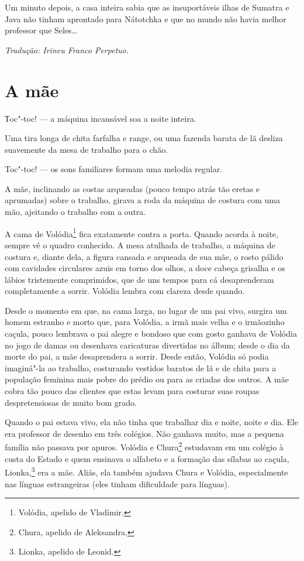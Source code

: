 Um minuto depois, a casa inteira sabia que as insuportáveis ilhas de
Sumatra e Java não tinham aprontado para Nátotchka e que no mundo não
havia melhor professor que Seles\ldots{}

\medskip

{\footnotesize\hfill\emph{Tradução: Irineu Franco Perpetuo.}}

\chapter{A mãe}\label{part13}

Тoc"-toc! --- a máquina incansável soa a noite inteira.

Uma tira longa de chita farfalha e range, ou uma fazenda barata de lã
desliza suavemente da mesa de trabalho para o chão.

Toc"-toc! --- os sons familiares formam uma melodia regular.

A mãe, inclinando as costas arqueadas (pouco tempo atrás tão eretas e
aprumadas) sobre o trabalho, girava a roda da máquina de costura com uma
mão, ajeitando o trabalho com a outra.

A cama de Volódia\footnote{Volódia, apelido de Vladímir.} fica
exatamente contra a porta. Quando acorda à noite, sempre vê o quadro
conhecido. A mesa atulhada de trabalho, a máquina de costura e, diante
dela, a figura cansada e arqueada de sua mãe, o rosto pálido com
cavidades circulares azuis em torno dos olhos, a doce cabeça grisalha e
os lábios tristemente comprimidos, que de uns tempos para cá
desaprenderam completamente a sorrir. Volódia lembra com clareza desde
quando.

Desde o momento em que, na cama larga, no lugar de um pai vivo, surgira
um homem estranho e morto que, para Volódia, a irmã mais velha e o
irmãozinho caçula, pouco lembrava o pai alegre e bondoso que com gosto
ganhava de Volódia no jogo de damas ou desenhava caricaturas divertidas
no álbum; desde o dia da morte do pai, a mãe desaprendera a sorrir.
Desde então, Volódia só podia imaginá"-la ao trabalho, costurando
vestidos baratos de lã e de chita para a população feminina mais pobre
do prédio ou para as criadas dos outros. A mãe cobra tão pouco das
clientes que estas levam para costurar suas roupas despretensiosas de
muito bom grado.

Quando o pai estava vivo, ela não tinha que trabalhar dia e noite, noite
e dia. Ele era professor de desenho em três colégios. Não ganhava muito,
mas a pequena família não passava por apuros. Volódia e Chura\footnote{Chura,
  apelido de Aleksandra.} estudavam em um colégio à custa do Estado e
quem ensinava o alfabeto e a formação das sílabas ao caçula,
Lionka,\footnote{Lionka, apelido de Leonid.} era a mãe. Aliás, ela
também ajudava Chura e Volódia, especialmente nas línguas estrangeiras
(eles tinham dificuldade para línguas).

